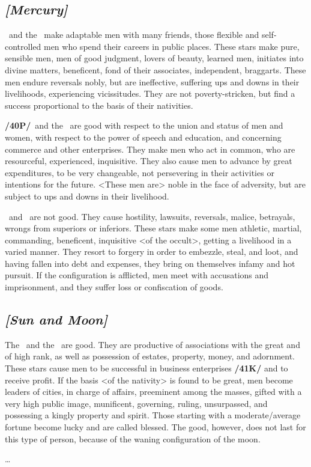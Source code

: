 \secbr
{}
\subsection{\textit{[Mercury]}}
\Mercury\, and the \Sun\, make adaptable men with many friends, those flexible and self-controlled men who spend their careers in public places. These stars make pure, sensible men, men of good judgment, lovers of beauty, learned men, initiates into divine matters, beneficent, fond of their associates, independent, braggarts. These men endure reversals nobly, but are ineffective, suffering ups and downs in their
livelihoods, experiencing vicissitudes. They are not poverty-stricken, but find a success proportional to the basis of their nativities.

\textbf{/40P/}\Mercury\, and the \Moon\, are good with respect to the union and status of men and women, with respect to the power of speech and education, and concerning commerce and other enterprises. They make men who act in common, who are resourceful, experienced, inquisitive. They also cause men to advance by great expenditures, to be very changeable, not persevering in their activities or intentions for the future.
<These men are> noble in the face of adversity, but are subject to ups and downs in their livelihood.

\Mercury\, and \Mars\, are not good. They cause hostility, lawsuits, reversals, malice, betrayals, wrongs
from superiors or inferiors. These stars make some men athletic, martial, commanding, beneficent, inquisitive <of the occult>, getting a livelihood in a varied manner. They resort to forgery in order to embezzle, steal, and loot, and having fallen into debt and expenses, they bring on themselves infamy and hot pursuit. If the configuration is afflicted, men meet with accusations and imprisonment, and they suffer
loss or confiscation of goods.

\secbr
{}
\subsection{\textit{[Sun and Moon]}}
The \Sun\, and the \Moon\, are good. They are productive of associations with the great and of high rank,
as well as possession of estates, property, money, and adornment. These stars cause men to be successful in business enterprises \textbf{/41K/} and to receive profit. If the basis <of the nativity> is found to be great, men become leaders of cities, in charge of affairs, preeminent among the masses, gifted with a very high public image, munificent, governing, ruling, unsurpassed, and possessing a kingly property and spirit. Those starting with a moderate/average fortune become lucky and are called blessed. The good, however, does not last for this type of person, because of the waning configuration of the moon. 

\ldots


\newpage